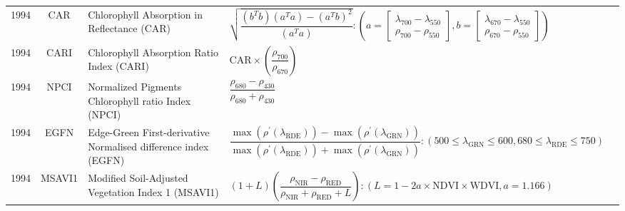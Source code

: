 \documentclass[10pt]{article}
\begin{document}
\begin{ThreePartTable}
\begin{longtable}{c c m{2.80in} M{2.80in} M{1.5in}}
  1994 & CAR     & Chlorophyll Absorption in Reflectance (CAR)                                    & $\sqrt{\dfrac{(b^Tb)(a^Ta)-(a^Tb)^2}{(a^Ta)}} :\left(a=\begin{bmatrix}\lambda_{700}-\lambda_{550}\\\rho_{700}-\rho_{550}\end{bmatrix},b=\begin{bmatrix}\lambda_{670}-\lambda_{550}\\\rho_{670}-\rho_{550}\end{bmatrix}\right)$                                                          & \citet{Kim1994}                                     \\
  1994 & CARI    & Chlorophyll Absorption Ratio Index (CARI)                                      & $\text{CAR}\times\left(\dfrac{\rho_{700}}{\rho_{670}}\right)$                                                                                                                                                                                                                           & \citet{Kim1994}                                     \\
  1994 & NPCI    & Normalized Pigments Chlorophyll ratio Index (NPCI)                             & $\dfrac{\rho_{680}-\rho_{430}}{\rho_{680}+\rho_{430}}$                                                                                                                                                                                                                                  & \citet{Penuelas1994}                                \\
  1994 & EGFN    & Edge-Green First-derivative Normalised difference index (EGFN)                 & $\dfrac{\max(\rho^\prime(\lambda_\text{RDE}))-\max(\rho^\prime(\lambda_\text{GRN}))}{\max(\rho^\prime(\lambda_\text{RDE}))+\max(\rho^\prime(\lambda_\text{GRN}))} : (500\le\lambda_\text{GRN}\le600,680\le\lambda_\text{RDE}\le750)$                                                    & \citet{Penuelas1994}                                \\
  1994 & MSAVI1  & Modified Soil-Adjusted Vegetation Index 1 (MSAVI1)                             & $(1 + L)\left(\dfrac{\rho_\text{NIR}-\rho_\text{RED}}{\rho_\text{NIR}+\rho_\text{RED}+L}\right):(L=1-2a\times\text{NDVI}\times\text{WDVI},a=1.166)$                                                                                                                                     & \citet{Qi1994,Huete1984}                                      \\

\end{longtable}
\end{ThreePartTable}
\end{document}
